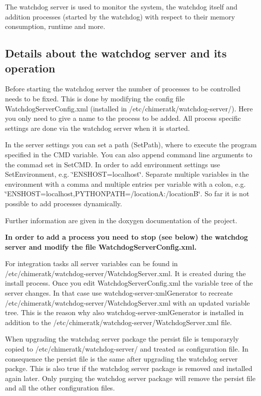 The watchdog server is used to monitor the system, the watchdog itself and addition processes (started by the watchdog) with respect to their memory consumption, runtime and more.

\subsection*{Details about the watchdog server and its operation}

Before starting the watchdog server the number of processes to be controlled needs to be fixed. This is done by modifying the config file {\ttfamily Watchdog\+Server\+Config.\+xml} (installed in {\ttfamily /etc/chimeratk/watchdog-\/server/}). Here you only need to give a name to the process to be added. All process specific settings are done via the watchdog server when it is started.

In the server settings you can set a path ({\ttfamily Set\+Path}), where to execute the program specified in the C\+MD variable. You can also append command line arguments to the commad set in {\ttfamily Set\+C\+MD}. In order to add environment settings use {\ttfamily Set\+Environment}, e.\+g. {\ttfamily \char`\"{}\+E\+N\+S\+H\+O\+S\+T=localhost\char`\"{}}. Separate multiple variables in the environment with a comma and multiple entries per variable with a colon, e.\+g. {\ttfamily \char`\"{}\+E\+N\+S\+H\+O\+S\+T=localhost,\+P\+Y\+T\+H\+O\+N\+P\+A\+T\+H=/location\+A\+:/location\+B\char`\"{}}. So far it is not possible to add processes dynamically.

Further information are given in the doxygen documentation of the project.

{\bfseries In order to add a process you need to stop (see below) the watchdog server and modify the file Watchdog\+Server\+Config.\+xml.}

For integration tasks all server variables can be found in {\ttfamily /etc/chimeratk/watchdog-\/server/\+Watchdog\+Server.xml}. It is created during the install process. Once you edit {\ttfamily Watchdog\+Server\+Config.\+xml} the variable tree of the server changes. In that case use {\ttfamily watchdog-\/server-\/xml\+Generator} to recreate {\ttfamily /etc/chimeratk/watchdog-\/server/\+Watchdog\+Server.xml} with an updated variable tree. This is the reason why also {\ttfamily watchdog-\/server-\/xml\+Generator} is installed in addition to the {\ttfamily /etc/chimeratk/watchdog-\/server/\+Watchdog\+Server.xml} file.

When upgrading the watchdag server package the persist file is temporaryly copied to {\ttfamily /etc/chimeratk/watchdog-\/server/} and treated as configuration file. In consequence the persist file is the same after upgrading the watchdog server packge. This is also true if the watchdog server package is removed and installed again later. Only purging the watchdog server package will remove the persist file and all the other configuration files.

